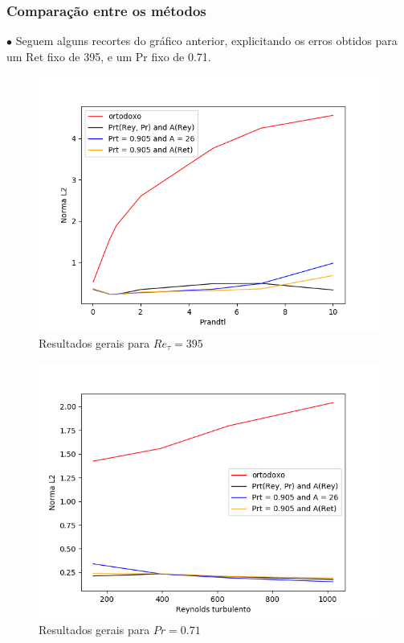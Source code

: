 \documentclass[xcolor=dvipsnames,10pt,aspectratio=169]{beamer}
\begin{document}
		\begin{frame}
		\frametitle{Comparação entre os métodos}
		$\bullet$ Seguem alguns recortes do gráfico anterior, explicitando os erros obtidos para um Ret fixo de 395, e um Pr fixo de 0.71.\\
		\begin{minipage}[h!]{0.47\textwidth}
			\begin{figure}
	\centering
	\includegraphics[angle=0, scale=0.39]{finaispr}
	\caption{Resultados gerais para $Re_\tau = 395$}
\end{figure}
		\end{minipage}
		\begin{minipage}[h!]{0.47\textwidth}
		\begin{figure}
			\centering
			\includegraphics[angle=0, scale=0.39]{finaisRey}
			\caption{Resultados gerais para $Pr = 0.71$}
		\end{figure}
		\end{minipage}\\
		\end{frame}
		
\end{document}
